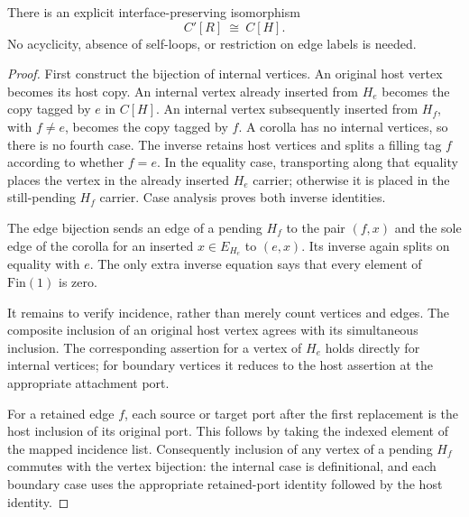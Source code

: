 \begin{lemma}
There is an explicit interface-preserving isomorphism
\[
             C'[R]\ \cong\ C[H].
\]
No acyclicity, absence of self-loops, or restriction on edge labels is needed.
\end{lemma}
\begin{proof}
First construct the bijection of internal vertices. An original host
vertex becomes its host copy. An internal vertex already inserted from
$H_e$ becomes the copy tagged by $e$ in $C[H]$. An internal vertex subsequently
inserted from $H_f$, with $f\ne e$, becomes the copy tagged by $f$.
A corolla has no internal vertices, so there is no fourth case.
The inverse retains host vertices and splits a filling tag $f$ according
to whether $f=e$. In the equality case, transporting along that equality
places the vertex in the already inserted $H_e$ carrier; otherwise it is
placed in the still-pending $H_f$ carrier. Case analysis proves both inverse
identities.

The edge bijection sends an edge of a pending $H_f$ to the pair $(f,x)$
and the sole edge of the corolla for an inserted $x\in E_{H_e}$ to $(e,x)$.
Its inverse again splits on equality with $e$. The only extra inverse
equation says that every element of $\mathrm{Fin}(1)$ is zero.

It remains to verify incidence, rather than merely count vertices and edges.
The composite inclusion of an original host vertex agrees with its
simultaneous inclusion. The corresponding assertion for a vertex of $H_e$
holds directly for internal vertices; for boundary vertices it reduces to
the host assertion at the appropriate attachment port.

For a retained edge $f$, each source or target port after the first
replacement is the host inclusion of its original port. This follows by
taking the indexed element of the mapped incidence list.
Consequently inclusion of any vertex of a pending $H_f$ commutes with the
vertex bijection: the internal case is definitional, and each boundary
case uses the appropriate retained-port identity followed by the host
identity.


\end{proof}
